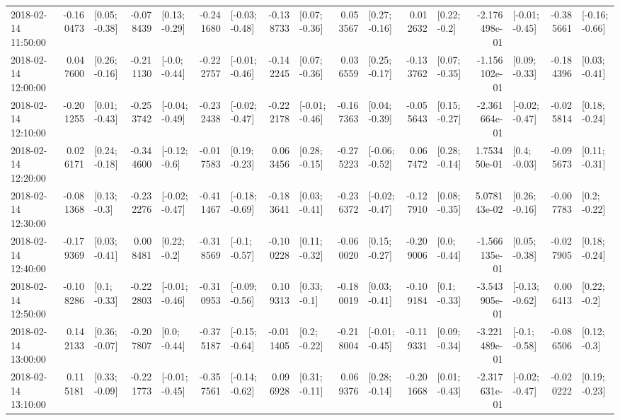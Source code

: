 \begin{tabular}{lrlrlrlrlrlrlrlrl}
2018-02-14 11:50:00 & -0.160473 &   [0.05; -0.38] & -0.078439 &   [0.13; -0.29] & -0.241680 &  [-0.03; -0.48] & -0.138733 &   [0.07; -0.36] &  0.053567 &   [0.27; -0.16] &  0.012632 &    [0.22; -0.2] & -2.176498e-01 &  [-0.01; -0.45] & -0.385661 &  [-0.16; -0.66] \\
2018-02-14 12:00:00 &  0.047600 &   [0.26; -0.16] & -0.211130 &   [-0.0; -0.44] & -0.222757 &  [-0.01; -0.46] & -0.142245 &   [0.07; -0.36] &  0.036559 &   [0.25; -0.17] & -0.133762 &   [0.07; -0.35] & -1.156102e-01 &   [0.09; -0.33] & -0.184396 &   [0.03; -0.41] \\
2018-02-14 12:10:00 & -0.201255 &   [0.01; -0.43] & -0.253742 &  [-0.04; -0.49] & -0.232438 &  [-0.02; -0.47] & -0.222178 &  [-0.01; -0.46] & -0.167363 &   [0.04; -0.39] & -0.055643 &   [0.15; -0.27] & -2.361664e-01 &  [-0.02; -0.47] & -0.025814 &   [0.18; -0.24] \\
2018-02-14 12:20:00 &  0.026171 &   [0.24; -0.18] & -0.344600 &   [-0.12; -0.6] & -0.017583 &   [0.19; -0.23] &  0.063456 &   [0.28; -0.15] & -0.275223 &  [-0.06; -0.52] &  0.067472 &   [0.28; -0.14] &  1.753450e-01 &    [0.4; -0.03] & -0.095673 &   [0.11; -0.31] \\
2018-02-14 12:30:00 & -0.081368 &    [0.13; -0.3] & -0.232276 &  [-0.02; -0.47] & -0.411467 &  [-0.18; -0.69] & -0.183641 &   [0.03; -0.41] & -0.236372 &  [-0.02; -0.47] & -0.127910 &   [0.08; -0.35] &  5.078143e-02 &   [0.26; -0.16] & -0.007783 &    [0.2; -0.22] \\
2018-02-14 12:40:00 & -0.179369 &   [0.03; -0.41] &  0.008481 &    [0.22; -0.2] & -0.318569 &   [-0.1; -0.57] & -0.100228 &   [0.11; -0.32] & -0.060020 &   [0.15; -0.27] & -0.209006 &    [0.0; -0.44] & -1.566135e-01 &   [0.05; -0.38] & -0.027905 &   [0.18; -0.24] \\
2018-02-14 12:50:00 & -0.108286 &    [0.1; -0.33] & -0.222803 &  [-0.01; -0.46] & -0.310953 &  [-0.09; -0.56] &  0.109313 &    [0.33; -0.1] & -0.180019 &   [0.03; -0.41] & -0.109184 &    [0.1; -0.33] & -3.543905e-01 &  [-0.13; -0.62] &  0.006413 &    [0.22; -0.2] \\
2018-02-14 13:00:00 &  0.142133 &   [0.36; -0.07] & -0.207807 &    [0.0; -0.44] & -0.375187 &  [-0.15; -0.64] & -0.011405 &    [0.2; -0.22] & -0.218004 &  [-0.01; -0.45] & -0.119331 &   [0.09; -0.34] & -3.221489e-01 &   [-0.1; -0.58] & -0.086506 &    [0.12; -0.3] \\
2018-02-14 13:10:00 &  0.115181 &   [0.33; -0.09] & -0.221773 &  [-0.01; -0.45] & -0.357561 &  [-0.14; -0.62] &  0.096928 &   [0.31; -0.11] &  0.069376 &   [0.28; -0.14] & -0.201668 &   [0.01; -0.43] & -2.317631e-01 &  [-0.02; -0.47] & -0.020222 &   [0.19; -0.23] \\

\end{tabular}
